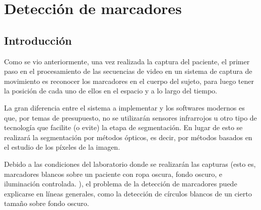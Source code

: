 \section{Detección de marcadores}
\label{deteccionMarcadoresSec}
\subsection{Introducción}

Como se vio anteriormente, una vez realizada la captura del paciente, el primer paso en el procesamiento de las secuencias de video en un sistema de captura de movimiento es reconocer los marcadores en el cuerpo del sujeto, para luego tener la posición de cada uno de ellos en el espacio y a lo largo del tiempo. 

La gran diferencia entre el sistema a implementar y los softwares modernos es que, por temas de presupuesto, no se utilizarán sensores infrarrojos u otro tipo de tecnología que facilite (o evite) la etapa de segmentación. En lugar de esto se realizará la segmentación por métodos ópticos, es decir, por métodos basados en el estudio de los píxeles de la imagen. 

Debido a las condiciones del laboratorio donde se realizarán las capturas (esto es, marcadores blancos sobre un paciente con ropa oscura, fondo oscuro, e iluminación controlada. ), el problema de la detección de marcadores puede explicarse en líneas generales, como la detección de círculos blancos de un cierto tamaño sobre fondo oscuro.

